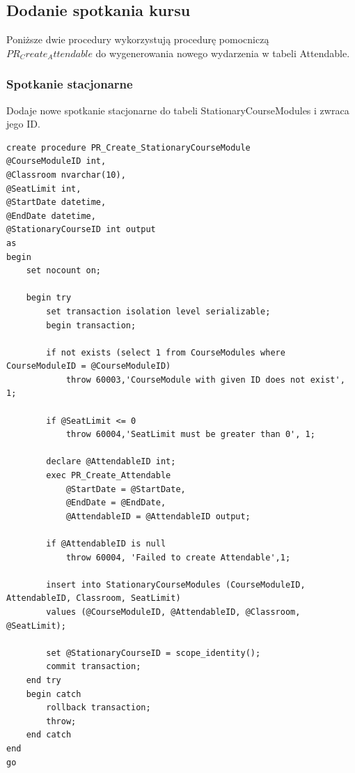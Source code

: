 \documentclass[11pt,a4paper]{article}
\begin{document}
\subsection{Dodanie spotkania kursu}
Poniższe dwie procedury wykorzystują procedurę pomocniczą $PR_Create_Attendable$ do wygenerowania nowego wydarzenia w tabeli Attendable.
\subsubsection{Spotkanie stacjonarne}
Dodaje nowe spotkanie stacjonarne do tabeli StationaryCourseModules i zwraca jego ID.
\begin{Verbatim}[breaklines=true]
create procedure PR_Create_StationaryCourseModule
@CourseModuleID int,
@Classroom nvarchar(10),
@SeatLimit int,
@StartDate datetime,
@EndDate datetime,
@StationaryCourseID int output
as
begin
    set nocount on;

    begin try
        set transaction isolation level serializable;
        begin transaction;

        if not exists (select 1 from CourseModules where CourseModuleID = @CourseModuleID)
            throw 60003,'CourseModule with given ID does not exist', 1;

        if @SeatLimit <= 0
            throw 60004,'SeatLimit must be greater than 0', 1;

        declare @AttendableID int;
        exec PR_Create_Attendable
            @StartDate = @StartDate,
            @EndDate = @EndDate,
            @AttendableID = @AttendableID output;

        if @AttendableID is null
            throw 60004, 'Failed to create Attendable',1;

        insert into StationaryCourseModules (CourseModuleID, AttendableID, Classroom, SeatLimit)
        values (@CourseModuleID, @AttendableID, @Classroom, @SeatLimit);

        set @StationaryCourseID = scope_identity();
        commit transaction;
    end try
    begin catch
        rollback transaction;
        throw;
    end catch
end
go
\end{Verbatim}
\end{document}
